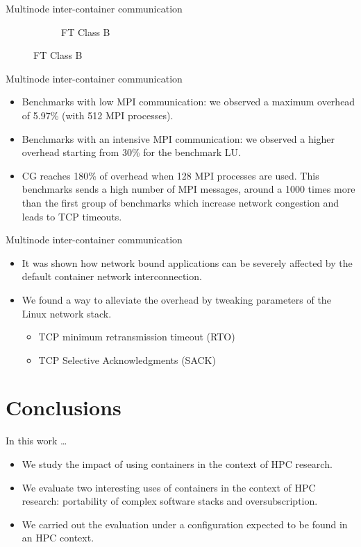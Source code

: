 \documentclass[presentation]{beamer}
\begin{document}
\begin{frame}[label=sec-3-7]{Multinode inter-container communication}
\begin{figure}
\begin{subfigure}[b]{0.42\textwidth}
    \caption{FT Class B}
  \end{subfigure}
\end{figure}
\end{frame}

\begin{frame}[label=sec-3-8]{Multinode inter-container communication}
\begin{itemize}
\item Benchmarks with low  MPI communication: we observed a maximum overhead of \alert{5.97\%} (with \alert{512 MPI processes}).
\item Benchmarks with an intensive MPI communication: we observed a higher overhead starting from \alert{30\%} for the benchmark LU.

\item CG reaches \alert{180\%} of overhead when \alert{128} MPI processes are used.
This benchmarks sends a high number of MPI messages, around
a 1000 times more than the first group of benchmarks
which increase network congestion and leads to TCP timeouts.
\end{itemize}
\end{frame}

\begin{frame}[label=sec-3-9]{Multinode inter-container communication}
\begin{itemize}
\item It was shown how network bound applications can be severely affected by
the default container network interconnection.

\item We found a way to alleviate the overhead
by tweaking parameters of the Linux network stack.

\begin{itemize}
\item TCP minimum retransmission timeout (RTO)
\item TCP Selective Acknowledgments (SACK)
\end{itemize}
\end{itemize}
\end{frame}


\section{Conclusions}
\label{sec-4}
\begin{frame}[label=sec-4-1]{In this work \ldots{}}
\begin{itemize}
\item We study the impact of using containers in the context of HPC research.

\item We evaluate two interesting uses of containers in the context of HPC research: portability of complex software stacks
and oversubscription.

\item We carried out the evaluation under a configuration expected to be found in an HPC context.
\end{itemize}
\end{frame}
\end{document}
